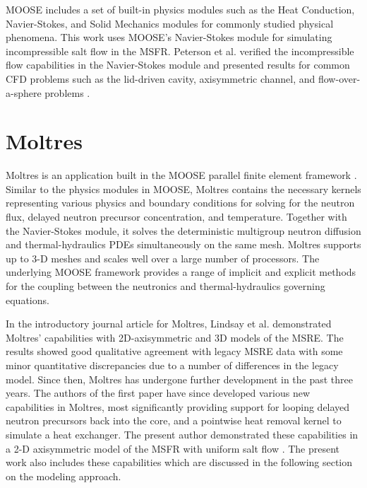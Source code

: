 \gls{MOOSE} includes a set of built-in physics modules such as the Heat
Conduction, Navier-Stokes, and Solid Mechanics modules for commonly studied
physical phenomena. This
work uses \gls{MOOSE}'s Navier-Stokes module for simulating
incompressible salt flow in the \gls{MSFR}. Peterson et al. verified the
incompressible flow capabilities in the
Navier-Stokes module and presented results for common \gls{CFD} problems such
as the lid-driven cavity, axisymmetric channel, and flow-over-a-sphere
problems \cite{peterson_overview_2017}. 

\section{Moltres}

Moltres is an application built in the \gls{MOOSE} parallel finite element
framework \cite{lindsay_introduction_2018}. Similar to the physics modules in
\gls{MOOSE}, Moltres contains the necessary kernels representing various
physics and boundary conditions for solving for the neutron flux, delayed
neutron precursor concentration, and temperature. Together with the
Navier-Stokes module, it solves
the deterministic multigroup neutron diffusion and thermal-hydraulics
\glspl{PDE} simultaneously on the same mesh. Moltres supports up to 3-D meshes
and scales well over a large number of processors. The underlying \gls{MOOSE}
framework provides a range of implicit and explicit methods for the coupling
between the neutronics and thermal-hydraulics governing equations.

In the introductory journal article for Moltres, Lindsay et al.
\cite{lindsay_introduction_2018} demonstrated Moltres' capabilities with
2D-axisymmetric and 3D models of the \gls{MSRE}. The results showed good
qualitative agreement with legacy \gls{MSRE} data with some minor
quantitative discrepancies due to a number of differences in the legacy model. 
Since then, Moltres has undergone further development in the past three years.
The authors of the first paper have since developed various new capabilities
in Moltres, most significantly providing support for looping delayed neutron
precursors back into the core, and a pointwise heat removal kernel to simulate
a heat exchanger. The present author demonstrated these capabilities in a
2-D axisymmetric model of the \gls{MSFR} with uniform salt flow
\cite{park_safety_2019}. The present work also includes these capabilities
which are discussed in the following section on the modeling approach.

